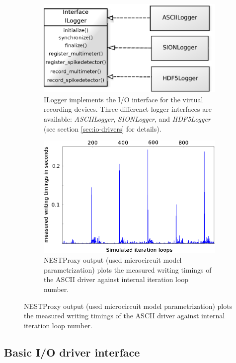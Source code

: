 \documentclass[]{YIC2015}
\begin{document}
\begin{figure}[tb]
\centering %
\begin{subfigure}[b]{0.49\textwidth}
                \includegraphics[width=.85\linewidth]{loggerinterface.eps}
                \caption{ILogger implements the I/O interface for the virtual
			recording devices.  Three differenct logger interfaces are
			available: \emph{ASCIILogger}, \emph{SIONLogger}, and
			\emph{HDF5Logger} (see section \ref{sec:io-drivers} for details). \cite{yuml}}
                \label{fig:loggerinterface}
        \end{subfigure}%
        \hspace{0.009\textwidth}
        \begin{subfigure}[b]{0.49\textwidth}
	      \includegraphics[width=.85\linewidth]{ascii_plot_10_8.eps}
	      \caption{NESTProxy output (used microcircuit model parametrization)
	      plots the measured writing timings of the ASCII driver against internal iteration loop number.}
	      \label{fig:asciiplot}
        \end{subfigure}%


\end{figure}

\subsection{Basic I/O driver interface}
\end{document}
